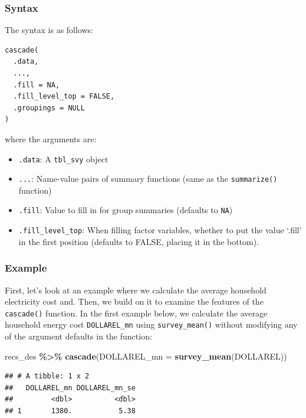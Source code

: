 \documentclass[
]{krantz}
\makeatletter
\newenvironment{Shaded}{\begin{snugshade}}{\end{snugshade}}
\newcommand{\AttributeTok}[1]{\textcolor[rgb]{0.27,0.27,0.27}{#1}}
\newcommand{\FunctionTok}[1]{\textcolor[rgb]{0.27,0.27,0.27}{\textbf{#1}}}
\newcommand{\NormalTok}[1]{#1}
\newcommand{\SpecialCharTok}[1]{\textcolor[rgb]{0.43,0.43,0.43}{\textbf{#1}}}
\providecommand{\tightlist}{%
  \setlength{\itemsep}{0pt}\setlength{\parskip}{0pt}}
\newenvironment{kframe}{%
\medskip{}
\setlength{\fboxsep}{.8em}
 \def\at@end@of@kframe{}%
 \ifinner\ifhmode%
  \def\at@end@of@kframe{\end{minipage}}%
  \begin{minipage}{\columnwidth}%
 \fi\fi%
 \def\FrameCommand##1{\hskip\@totalleftmargin \hskip-\fboxsep
 \colorbox{shadecolor}{##1}\hskip-\fboxsep
     \hskip-\linewidth \hskip-\@totalleftmargin \hskip\columnwidth}%
 \MakeFramed {\advance\hsize-\width
   \@totalleftmargin\z@ \linewidth\hsize
   \@setminipage}}%
 {\par\unskip\endMakeFramed%
 \at@end@of@kframe}
\renewenvironment{Shaded}{\begin{kframe}}{\end{kframe}}
\makeatother
\begin{document}
\hypertarget{syntax-5}{%
\subsubsection*{Syntax}\label{syntax-5}}


The syntax is as follows:

\begin{verbatim}
cascade(
  .data, 
  ..., 
  .fill = NA, 
  .fill_level_top = FALSE, 
  .groupings = NULL
)
\end{verbatim}

where the arguments are:

\begin{itemize}
\tightlist
\item
  \texttt{.data}: A \texttt{tbl\_svy} object
\item
  \texttt{...}: Name-value pairs of summary functions (same as the \texttt{summarize()} function)
\item
  \texttt{.fill}: Value to fill in for group summaries (defaults to \texttt{NA})
\item
  \texttt{.fill\_level\_top}: When filling factor variables, whether to put the value `.fill' in the first position (defaults to FALSE, placing it in the bottom).
\end{itemize}

\hypertarget{example}{%
\subsubsection*{Example}\label{example}}


First, let's look at an example where we calculate the average household electricity cost and. Then, we build on it to examine the features of the \texttt{cascade()} function. In the first example below, we calculate the average household energy cost \texttt{DOLLAREL\_mn} using \texttt{survey\_mean()} without modifying any of the argument defaults in the function:

\begin{Shaded}
\begin{Highlighting}[]
\NormalTok{recs\_des }\SpecialCharTok{\%\textgreater{}\%}
  \FunctionTok{cascade}\NormalTok{(}\AttributeTok{DOLLAREL\_mn =} \FunctionTok{survey\_mean}\NormalTok{(DOLLAREL))}
\end{Highlighting}
\end{Shaded}

\begin{verbatim}
## # A tibble: 1 x 2
##   DOLLAREL_mn DOLLAREL_mn_se
##         <dbl>          <dbl>
## 1       1380.           5.38
\end{verbatim}
\end{document}

